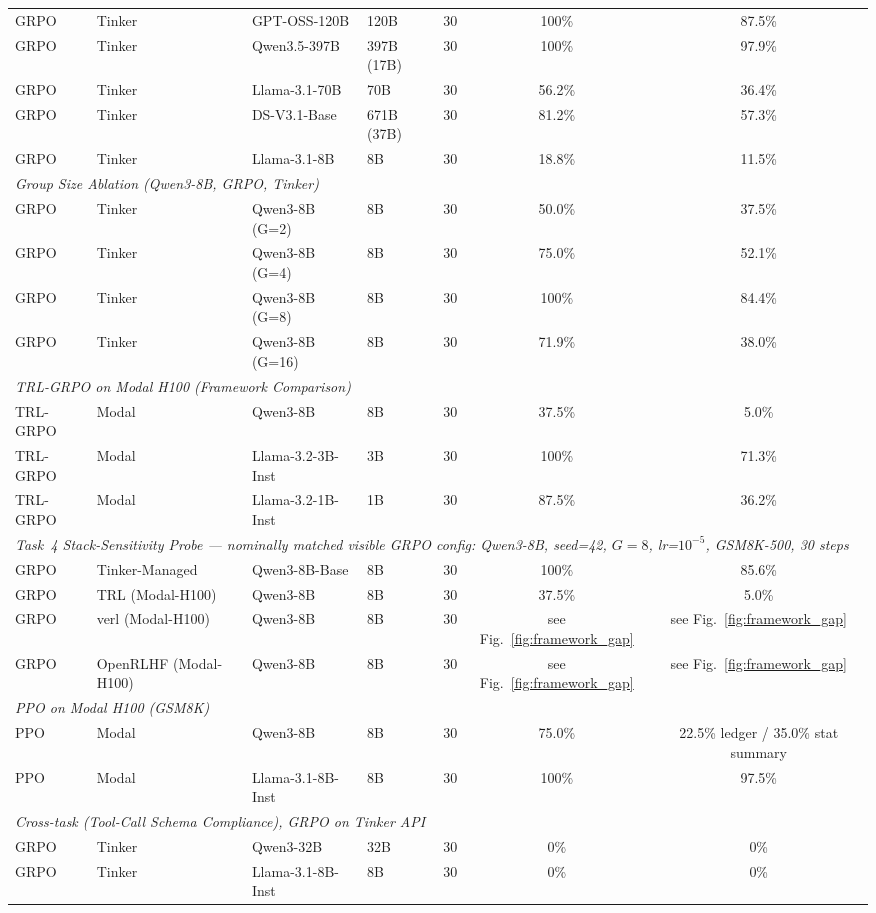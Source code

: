 \documentclass{article}
\begin{document}
\begin{table}[t]
\begin{tabular}{@{}l l l l r c c@{}}
GRPO & Tinker & GPT-OSS-120B & 120B & 30 & 100\% & 87.5\% \\
GRPO & Tinker & Qwen3.5-397B & 397B (17B) & 30 & 100\% & 97.9\% \\
GRPO & Tinker & Llama-3.1-70B & 70B & 30 & 56.2\% & 36.4\% \\
GRPO & Tinker & DS-V3.1-Base & 671B (37B) & 30 & 81.2\% & 57.3\% \\
GRPO & Tinker & Llama-3.1-8B & 8B & 30 & 18.8\% & 11.5\% \\
\midrule
\multicolumn{7}{l}{\textit{Group Size Ablation (Qwen3-8B, GRPO, Tinker)}} \\
\midrule
GRPO & Tinker & Qwen3-8B (G=2) & 8B & 30 & 50.0\% & 37.5\% \\
GRPO & Tinker & Qwen3-8B (G=4) & 8B & 30 & 75.0\% & 52.1\% \\
GRPO & Tinker & Qwen3-8B (G=8) & 8B & 30 & 100\% & 84.4\% \\
GRPO & Tinker & Qwen3-8B (G=16) & 8B & 30 & 71.9\% & 38.0\% \\
\midrule
\multicolumn{7}{l}{\textit{TRL-GRPO on Modal H100 (Framework Comparison)}} \\
\midrule
TRL-GRPO & Modal & Qwen3-8B & 8B & 30 & 37.5\% & 5.0\% \\
TRL-GRPO & Modal & Llama-3.2-3B-Inst & 3B & 30 & 100\% & 71.3\% \\
TRL-GRPO & Modal & Llama-3.2-1B-Inst & 1B & 30 & 87.5\% & 36.2\% \\
\midrule
\multicolumn{7}{l}{\textit{Task~4 Stack-Sensitivity Probe --- nominally matched visible GRPO config: Qwen3-8B, seed=42, $G=8$, lr=$10^{-5}$, GSM8K-500, 30 steps}} \\
\midrule
GRPO & Tinker-Managed & Qwen3-8B-Base & 8B & 30 & 100\% & 85.6\% \\
GRPO & TRL (Modal-H100) & Qwen3-8B & 8B & 30 & 37.5\% & 5.0\% \\
GRPO & verl (Modal-H100) & Qwen3-8B & 8B & 30 & see Fig.~\ref{fig:framework_gap} & see Fig.~\ref{fig:framework_gap} \\
GRPO & OpenRLHF (Modal-H100) & Qwen3-8B & 8B & 30 & see Fig.~\ref{fig:framework_gap} & see Fig.~\ref{fig:framework_gap} \\
\midrule
\multicolumn{7}{l}{\textit{PPO on Modal H100 (GSM8K)}} \\
\midrule
PPO & Modal & Qwen3-8B & 8B & 30 & 75.0\% & 22.5\% ledger / 35.0\% stat summary \\
PPO & Modal & Llama-3.1-8B-Inst & 8B & 30 & 100\% & 97.5\% \\
\midrule
\multicolumn{7}{l}{\textit{Cross-task (Tool-Call Schema Compliance), GRPO on Tinker API}} \\
\midrule
GRPO & Tinker & Qwen3-32B & 32B & 30 & 0\% & 0\% \\
GRPO & Tinker & Llama-3.1-8B-Inst & 8B & 30 & 0\% & 0\% \\
\bottomrule
\end{tabular}
\end{table}
\end{document}
